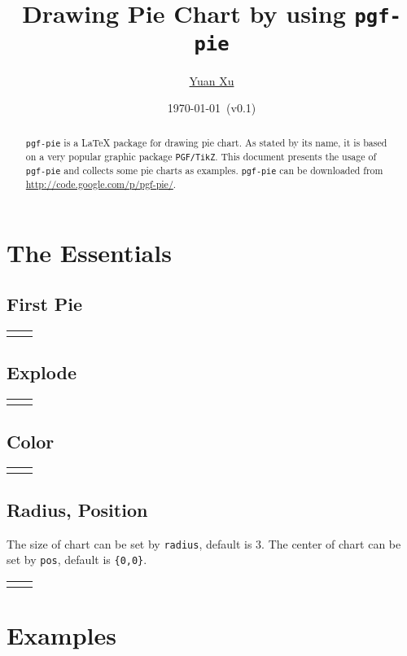 \documentclass{article}
\newcommand{\demo}[2][1]{
  \begin{center}
  \begin{tabular}{cc}
    \begin{minipage}{.49\linewidth}
      \centering
      \resizebox{#1\linewidth}{!}{
        
      }
    \end{minipage}
    &
    \begin{minipage}{.45\linewidth}
      
    \end{minipage}
  \end{tabular}
  \end{center}
}
\begin{document}
\title{Drawing Pie Chart by using \texttt{pgf-pie}}
\author{\href{mailto:xuyuan.cn@gmail.com}{Yuan Xu}}
\date{\today{}~(v0.1)}
\maketitle

\begin{abstract}
  \texttt{pgf-pie} is a LaTeX package for drawing pie chart. As stated
  by its name, it is based on a very popular graphic package
  \texttt{PGF/TikZ}. This document presents the usage of
  \texttt{pgf-pie} and collects some pie charts as examples.
  \texttt{pgf-pie} can be downloaded from
  \href{http://code.google.com/p/pgf-pie/}{http://code.google.com/p/pgf-pie/}.
\end{abstract}

\tableofcontents

\section{The Essentials}

\subsection{First Pie}
\demo[0.6]{first-pie}

\subsection{Explode}
\demo[0.6]{explode}

\subsection{Color}
\demo[0.6]{color}

\subsection{Radius, Position}
The size of chart can be set by \texttt{radius}, default is 3. The
center of chart can be set by \texttt{pos}, default is \texttt{\{0,0\}}.

\demo{radius}

\section{Examples}
\end{document}
